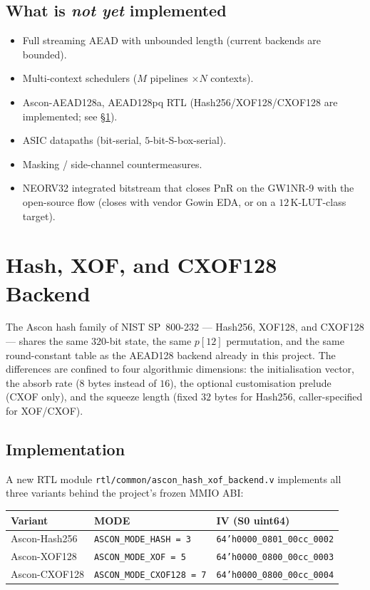 \documentclass[11pt,a4paper]{article}
\begin{document}
\subsection{What is \textit{not yet} implemented}

\begin{itemize}[noitemsep]
  \item Full streaming AEAD with unbounded length (current backends are bounded).
  \item Multi-context schedulers ($M$ pipelines $\times N$ contexts).
  \item Ascon-AEAD128a, AEAD128pq RTL (Hash256/XOF128/CXOF128 are
        implemented; see §\ref{sec:hash}).
  \item ASIC datapaths (bit-serial, $5$-bit-S-box-serial).
  \item Masking / side-channel countermeasures.
  \item NEORV32 integrated bitstream that closes PnR on the GW1NR-9 with
        the open-source flow (closes with vendor Gowin EDA, or on a
        $12$\,K-LUT-class target).
\end{itemize}

\section{Hash, XOF, and CXOF128 Backend}
\label{sec:hash}

The Ascon hash family of NIST SP~800-232 --- Hash256, XOF128, and
CXOF128 --- shares the same $320$-bit state, the same $p[12]$
permutation, and the same round-constant table as the AEAD128 backend
already in this project. The differences are confined to four
algorithmic dimensions: the initialisation vector, the absorb rate
($8$ bytes instead of $16$), the optional customisation prelude
(CXOF only), and the squeeze length (fixed $32$ bytes for Hash256,
caller-specified for XOF/CXOF).

\subsection{Implementation}

A new RTL module \texttt{rtl/common/ascon\_hash\_xof\_backend.v}
implements all three variants behind the project's frozen MMIO ABI:

\begin{center}
\small
\begin{tabular}{lll}
\toprule
\rowcolor{tabhead!20}\textbf{Variant} & \textbf{MODE} & \textbf{IV (S0 uint64)} \\
\midrule
Ascon-Hash256  & \texttt{ASCON\_MODE\_HASH    = 3} & \texttt{64'h0000\_0801\_00cc\_0002} \\
Ascon-XOF128   & \texttt{ASCON\_MODE\_XOF     = 5} & \texttt{64'h0000\_0800\_00cc\_0003} \\
Ascon-CXOF128  & \texttt{ASCON\_MODE\_CXOF128 = 7} & \texttt{64'h0000\_0800\_00cc\_0004} \\
\bottomrule
\end{tabular}
\end{center}
\end{document}
